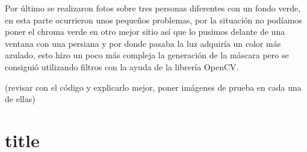 Por último se realizaron fotos sobre tres personas diferentes con un fondo verde, en esta parte ocurrieron unos pequeños problemas, por la situación no podíamos poner el chroma verde en otro mejor sitio así que lo pusimos delante de una ventana con una persiana y por donde pasaba la luz adquiría un color más azulado, esto hizo un poco más compleja la generación de la máscara pero se consiguió utilizando filtros con la ayuda de la librería OpenCV.

(revisar con el código y explicarlo mejor, poner imágenes de prueba en cada una de ellas)

\section{title}